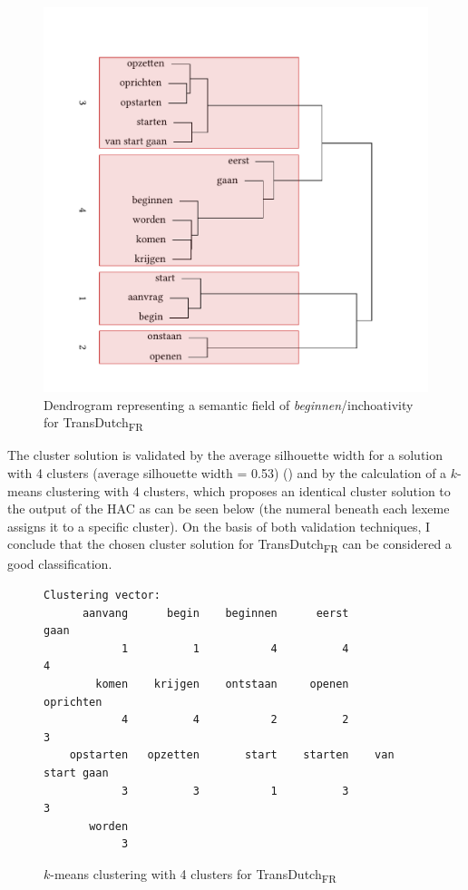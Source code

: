 \begin{figure}
\includegraphics[height=.4\textheight]{figures/tree78.pdf}
\caption{\label{fig:4:76}  Dendrogram representing a semantic field of \textit{beginnen}/inchoativity for TransDutch\textsubscript{FR}}
\end{figure}

The cluster solution is validated by the average silhouette width for a solution with 4 clusters (average silhouette width = 0.53) () and by the calculation of a $k$-means clustering with 4 clusters, which proposes an identical cluster solution to the output of the HAC as can be seen below (the numeral beneath each lexeme assigns it to a specific cluster). On the basis of both validation techniques, I conclude that the chosen cluster solution for TransDutch\textsubscript{FR} can be considered a good classification.

\begin{figure}
\begin{lstlisting}
Clustering vector:
      aanvang      begin    beginnen      eerst              gaan 
            1          1           4          4                 4
        komen    krijgen    ontstaan     openen         oprichten
            4          4           2          2                 3
    opstarten   opzetten       start    starten    van start gaan
            3          3           1          3                 3
       worden               
            3               
\end{lstlisting}
\caption{\label{fig:4:kmeansdutch4}$k$-means clustering with 4 clusters for TransDutch\textsubscript{FR}}
\end{figure}

